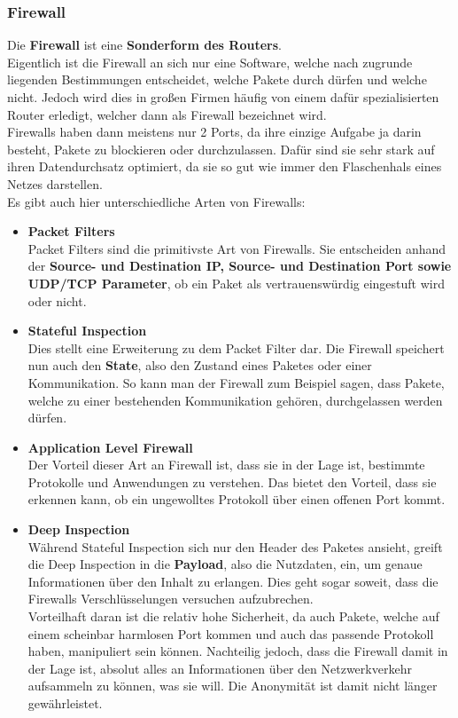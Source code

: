 \documentclass[12pt,a4paper]{report}
\begin{document}
\begin{onehalfspace}
\subsubsection{Firewall}
Die \textbf{Firewall} ist eine \textbf{Sonderform des Routers}.\\
Eigentlich ist die Firewall an sich nur eine Software, welche nach zugrunde liegenden Bestimmungen entscheidet, welche Pakete durch dürfen und welche nicht. Jedoch wird dies in großen Firmen häufig von einem dafür spezialisierten Router erledigt, welcher dann als Firewall bezeichnet wird.\\
Firewalls haben dann meistens nur 2 Ports, da ihre einzige Aufgabe ja darin besteht, Pakete zu blockieren oder durchzulassen. Dafür sind sie sehr stark auf ihren Datendurchsatz optimiert, da sie so gut wie immer den Flaschenhals eines Netzes darstellen.\\
Es gibt auch hier unterschiedliche Arten von Firewalls:\\
\begin{itemize}
\item \textbf{Packet Filters}\\
Packet Filters sind die primitivste Art von Firewalls. Sie entscheiden anhand der \textbf{Source- und Destination IP, Source- und Destination Port sowie UDP/TCP Parameter}, ob ein Paket als vertrauenswürdig eingestuft wird oder nicht.
\item \textbf{Stateful Inspection}\\
Dies stellt eine Erweiterung zu dem Packet Filter dar. Die Firewall speichert nun auch den \textbf{State}, also den Zustand eines Paketes oder einer Kommunikation. So kann man der Firewall zum Beispiel sagen, dass Pakete, welche zu einer bestehenden Kommunikation gehören, durchgelassen werden dürfen. 
\item \textbf{Application Level Firewall}\\
Der Vorteil dieser Art an Firewall ist, dass sie in der Lage ist, bestimmte Protokolle und Anwendungen zu \glqq verstehen\grqq . Das bietet den Vorteil, dass sie erkennen kann, ob ein ungewolltes Protokoll über einen offenen Port kommt.
\item \textbf{Deep Inspection}\\
Während Stateful Inspection sich nur den Header des Paketes ansieht, greift die Deep Inspection in die \textbf{Payload}, also die Nutzdaten, ein, um genaue Informationen über den Inhalt zu erlangen. Dies geht sogar soweit, dass die Firewalls Verschlüsselungen versuchen aufzubrechen.\\
Vorteilhaft daran ist die relativ hohe Sicherheit, da auch Pakete, welche auf einem scheinbar harmlosen Port kommen und auch das passende Protokoll haben, manipuliert sein können. Nachteilig jedoch, dass die Firewall damit in der Lage ist, absolut alles an Informationen über den Netzwerkverkehr aufsammeln zu können, was sie will. Die Anonymität ist damit nicht länger gewährleistet.
\end{itemize}


\end{onehalfspace}
\end{document}
